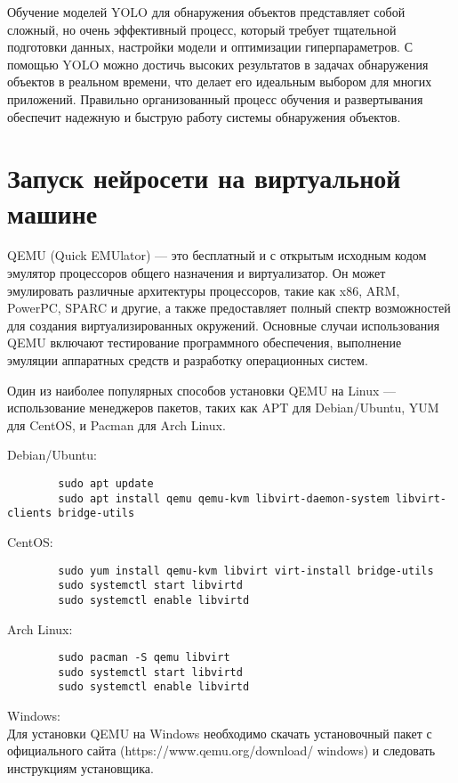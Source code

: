     Обучение моделей YOLO для обнаружения объектов представляет собой сложный, но очень эффективный процесс, который требует тщательной подготовки данных, настройки модели и оптимизации гиперпараметров. С помощью YOLO можно достичь высоких результатов в задачах обнаружения объектов в реальном времени, что делает его идеальным выбором для многих приложений. Правильно организованный процесс обучения и развертывания обеспечит надежную и быструю работу системы обнаружения объектов.

    \section{Запуск нейросети на виртуальной машине}
    QEMU (Quick EMUlator) — это бесплатный и с открытым исходным кодом эмулятор процессоров общего назначения и виртуализатор. Он может эмулировать различные архитектуры процессоров, такие как x86, ARM, PowerPC, SPARC и другие, а также предоставляет полный спектр возможностей для создания виртуализированных окружений. Основные случаи использования QEMU включают тестирование программного обеспечения, выполнение эмуляции аппаратных средств и разработку операционных систем.

    Один из наиболее популярных способов установки QEMU на Linux — использование менеджеров пакетов, таких как APT для Debian/Ubuntu, YUM для CentOS, и Pacman для Arch Linux.

    Debian/Ubuntu:
    \begin{lstlisting}
        sudo apt update
        sudo apt install qemu qemu-kvm libvirt-daemon-system libvirt-clients bridge-utils
    \end{lstlisting}
    
    CentOS:
    \begin{lstlisting}
        sudo yum install qemu-kvm libvirt virt-install bridge-utils
        sudo systemctl start libvirtd
        sudo systemctl enable libvirtd
    \end{lstlisting}
    
    Arch Linux:
    \begin{lstlisting}
        sudo pacman -S qemu libvirt
        sudo systemctl start libvirtd
        sudo systemctl enable libvirtd
    \end{lstlisting}
    
    Windows: \\
    Для установки QEMU на Windows необходимо скачать установочный пакет с официального сайта (https://www.qemu.org/download/ windows) и следовать инструкциям установщика.

